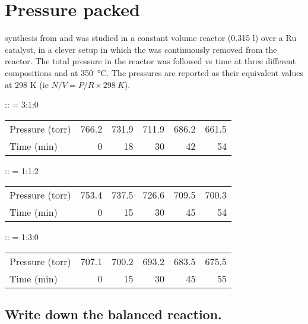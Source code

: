 \documentclass[11pt]{article}
\begin{document}
\section{Pressure packed}
\label{sec:org094b3e8}
 synthesis from  and  was studied in a constant volume reactor (0.315 l) over a Ru catalyst, in a clever setup in which the  was continuously removed from the reactor.  The total pressure in the reactor was followed vs time at three different compositions and at \SI{350}{\celsius}. The pressures are reported as their equivalent values at 298 K (ie \(N/V = P/R\times \SI{298}{K}\)).

\begin{center}
:: = 3:1:0
\end{center}
\begin{center}
\begin{tabular}{lrrrrr}
\hline
Pressure (torr) & 766.2 & 731.9 & 711.9 & 686.2 & 661.5\\
Time (min) & 0 & 18 & 30 & 42 & 54\\
\hline
\end{tabular}
\end{center}

\begin{center}
:: = 1:1:2
\end{center}
\begin{center}
\begin{tabular}{lrrrrr}
\hline
Pressure (torr) & 753.4 & 737.5 & 726.6 & 709.5 & 700.3\\
Time (min) & 0 & 15 & 30 & 45 & 54\\
\hline
\end{tabular}
\end{center}

\begin{center}
:: = 1:3:0
\end{center}
\begin{center}
\begin{tabular}{lrrrrr}
\hline
Pressure (torr) & 707.1 & 700.2 & 693.2 & 683.5 & 675.5\\
Time (min) & 0 & 15 & 30 & 45 & 55\\
\hline
\end{tabular}
\end{center}

\subsection{Write down the balanced reaction.}
\label{sec:org2a386ba}
\end{document}
